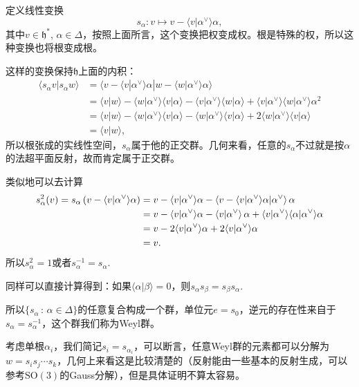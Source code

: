 \documentclass[9pt]{extarticle}
\begin{document}
\para 定义线性变换
\[
	s_\alpha:v\mapsto v-\langle v|\alpha^\vee\rangle\alpha,
\]
其中$v\in \mathfrak{h}^*$, $\alpha\in\Delta$，按照上面所言，这个变换把权变成权。根是特殊的权，所以这种变换也将根变成根。

这样的变换保持$\mathfrak{h}$上面的内积：
\begin{align*}
	\langle s_\alpha v|s_\alpha w\rangle &= \langle v-\langle v|\alpha^\vee\rangle\alpha|w-\langle w|\alpha^\vee\rangle\alpha\rangle\\ &=\langle v|w\rangle - \langle w|\alpha^\vee\rangle \langle v| \alpha\rangle - \langle v|\alpha^\vee\rangle \langle w| \alpha\rangle +\langle v|\alpha^\vee\rangle\langle w|\alpha^\vee\rangle \alpha^2\\
	&= \langle v|w\rangle - \langle w|\alpha^\vee\rangle \langle v| \alpha\rangle - \langle w|\alpha^\vee\rangle \langle v| \alpha\rangle +2\langle w|\alpha^\vee\rangle\langle v|\alpha\rangle\\
	&= \langle v|w\rangle,
\end{align*}
所以根张成的实线性空间，$s_\alpha$属于他的正交群。几何来看，任意的$s_\alpha$不过就是按$\alpha$的法超平面反射，故而肯定属于正交群。

\para 类似地可以去计算
\begin{align*}
	s_\alpha^2(v)=s_\alpha\left(v-\langle v|\alpha^\vee\rangle\alpha\right)&=v-\langle v|\alpha^\vee\rangle\alpha-\left\langle v-\langle v|\alpha^\vee\rangle\alpha\large|\alpha^\vee\right\rangle\alpha\\
	&=v-\langle v|\alpha^\vee\rangle\alpha-\left\langle v\large|\alpha^\vee\right\rangle\alpha+\langle v|\alpha^\vee\rangle\langle\alpha|\alpha^\vee\rangle\alpha\\
	&=v-2\langle v|\alpha^\vee\rangle\alpha+2\langle v|\alpha^\vee\rangle\alpha\\
	&=v.
\end{align*}
所以$s_\alpha^2=1$或者$s_\alpha^{-1}=s_\alpha$.

同样可以直接计算得到：如果$\langle \alpha|\beta\rangle=0$，则$s_\alpha s_\beta=s_\beta s_\alpha$.

\para 所以$\{s_\alpha\,:\, \alpha\in \Delta\}$的任意复合构成一个群，单位元$e=s_0$，逆元的存在性来自于$s_\alpha=s_\alpha^{-1}$，这个群我们称为Weyl群。

考虑单根$\alpha_i$，我们简记$s_i=s_{\alpha_i}$，可以断言，任意Weyl群的元素都可以分解为$w=s_is_j\cdots s_k$，几何上来看这是比较清楚的（反射能由一些基本的反射生成，可以参考$\mathrm{SO}(3)$的Gauss分解），但是具体证明不算太容易。
\end{document}

